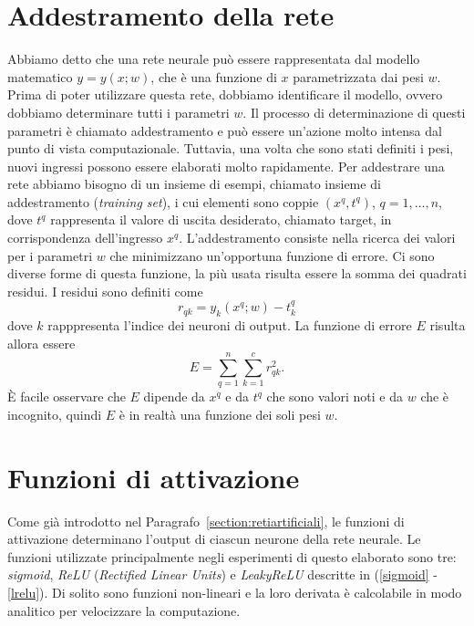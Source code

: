 \documentclass[11pt,a4paper,twoside,
openright]{book}
\begin{document}
\section{Addestramento della rete}
\label{addestramento}
Abbiamo detto che una rete neurale può essere rappresentata dal modello matematico $y = y(x; w)$, che è una funzione di $x$ parametrizzata dai pesi $w$. Prima di poter utilizzare questa rete, dobbiamo identificare il modello, ovvero dobbiamo determinare tutti i parametri $w$. Il processo di determinazione di questi parametri è chiamato addestramento e può essere un’azione molto intensa dal punto di vista computazionale. Tuttavia, una volta che sono stati definiti i pesi, nuovi ingressi possono essere elaborati molto rapidamente.
Per addestrare una rete abbiamo bisogno di un insieme di esempi, chiamato insieme di addestramento (\textit{training set}), i cui elementi sono coppie $(x^{q}, t^{q})$, $q = 1, \dots, n$, dove $t^{q}$ rappresenta il valore di uscita desiderato, chiamato target, in corrispondenza dell'ingresso $x^{q}$. 
L’addestramento consiste nella ricerca dei valori per i parametri $w$ che minimizzano un’opportuna funzione di errore. Ci sono diverse forme di questa funzione, la più usata risulta essere la somma dei quadrati residui. I residui sono definiti come
\begin{equation}
r_{qk} = y_{k}\left(x^{q}; w\right) - t^{q}_{k}
\label{res}
\end{equation}
dove $k$ rapppresenta l'indice dei neuroni di output.
La funzione di errore $E$ risulta allora essere
\begin{equation}
E = \sum\limits_{q=1}^n \sum\limits_{k=1}^c r_{qk}^{2}. 
\label{quadres}
\end{equation}
\`E facile osservare che $E$ dipende da $x^{q}$ e da $t^{q}$ che sono valori noti e da $w$ che è incognito, quindi $E$ è in realtà una funzione dei soli pesi $w$.

\section{Funzioni di attivazione}
Come già introdotto nel Paragrafo~\ref{section:retiartificiali}, le funzioni di attivazione determinano l'output di ciascun neurone della rete neurale.
Le funzioni utilizzate principalmente negli esperimenti di questo elaborato sono tre: \textit{sigmoid}, \textit{ReLU} (\textit{Rectified Linear Units}) e \textit{LeakyReLU} descritte in (\ref{sigmoid} -\ref{lrelu}).
Di solito sono funzioni non-lineari e la loro derivata è calcolabile in modo analitico per velocizzare la computazione.
\end{document}
